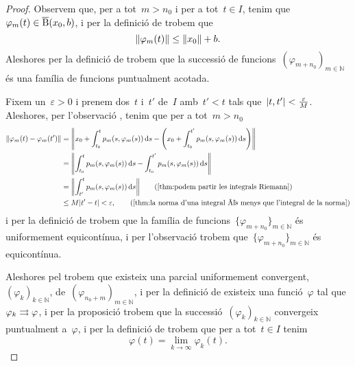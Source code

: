 \documentclass[../../main.tex]{subfiles}
\begin{document}
\begin{theorem}
\begin{proof}
			Observem que, per a tot~\(m>n_{0}\) i per a tot~\(t\in I\), tenim que~\(\varphi_{m}(t)\in\overline{\operatorname{B}}(x_{0},b)\), i per la definició de  trobem que
			\[
			    \norm{\varphi_{m}(t)}\leq\norm{x_{0}}+b.
			\]
			Aleshores per la definició de  trobem que la successió de funcions~\((\varphi_{m+n_{0}})_{m\in\mathbb{N}}\) és una família de funcions puntualment acotada.

			Fixem un~\(\varepsilon>0\) i prenem dos~\(t\) i~\(t'\) de~\(I\) amb~\(t'<t\) tals que~\(\abs{t,t'}<\frac{\varepsilon}{M}\).
			Aleshores, per l'observació , tenim que per a tot~\(m>n_{0}\)
			\begin{align*}
				\norm{\varphi_{m}(t)-\varphi_{m}(t')}&=\norm{x_{0}+\int_{t_{0}}^{t}p_{m}(s,\varphi_{m}(s))\diff s-\Bigg(x_{0}+\int_{t_{0}}^{t'}p_{m}(s,\varphi_{m}(s))\diff s\Bigg)} \\
				&=\norm{\int_{t_{0}}^{t}p_{m}(s,\varphi_{m}(s))\diff s-\int_{t_{0}}^{t'}p_{m}(s,\varphi_{m}(s))\diff s} \\
				&=\norm{\int_{t'}^{t}p_{m}(s,\varphi_{m}(s))\diff s} \tag{\ref{thm:podem partir les integrals Riemann}} \\
				&\leq M\abs{t'-t}<\varepsilon, \tag{\ref{thm:la norma d'una integral és menys que l'integral de la norma}}
			\end{align*}
			i per la definició de  trobem que la família de funcions~\(\{\varphi_{m+n_{0}}\}_{m\in\mathbb{N}}\) és uniformement equicontínua, i per l'observació  trobem que~\(\{\varphi_{m+n_{0}}\}_{m\in\mathbb{N}}\) és equicontínua.

			Aleshores pel  trobem que existeix una parcial uniformement convergent,~\((\varphi_{k})_{k\in\mathbb{N}}\), de~\((\varphi_{n_{0}+m})_{m\in\mathbb{N}}\), i per la definició de  existeix una funció~\(\varphi\) tal que~\(\varphi_{k}\mathrel{\rightrightarrows}\varphi\), i per la proposició  trobem que la successió~\((\varphi_{k})_{k\in\mathbb{N}}\) convergeix puntualment a~\(\varphi\), i per la definició de  trobem que per a tot~\(t\in I\) tenim
			\begin{equation}
				\label{thm:Teorema de Peano:eq1}
				\varphi(t)=\lim_{k\to\infty}\varphi_{k}(t).
			\end{equation}


\end{proof}
\end{theorem}
\end{document}
